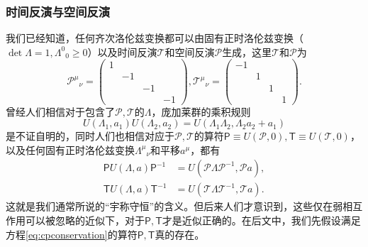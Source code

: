 \subsubsection{时间反演与空间反演}
我们已经知道，任何齐次洛伦兹变换都可以由固有正时洛伦兹变换（$ \det \Lambda =1,\Lambda ^{0}{}_{0} \geq 0$）以及时间反演$ \mathscr{T}$和空间反演$ \mathscr{P}$生成，这里$ \mathscr{T}$和$ \mathscr{P}$为
\begin{equation*}
	\mathscr{P}^{\mu }{}_{\nu } =\begin{pmatrix}
		1 &  &  & \\
		& -1 &  & \\
		&  & -1 & \\
		&  &  & -1
	\end{pmatrix} ,\mathscr{T}^{\mu }{}_{\nu } =\begin{pmatrix}
		-1 &  &  & \\
		& 1 &  & \\
		&  & 1 & \\
		&  &  & 1
	\end{pmatrix} .
\end{equation*}
曾经人们相信对于包含了$ \mathscr{P} ,\mathscr{T}$的$ \Lambda $，庞加莱群的乘积规则
\begin{equation*}
	U( \Lambda _{1} ,a_{1}) U( \Lambda _{2} ,a_{2}) =U( \Lambda _{1} \Lambda _{2} ,\Lambda _{2} a_{2} +a_{1})
\end{equation*}
是不证自明的，同时人们也相信对应于$ \mathscr{P} ,\mathscr{T}$的算符$ \mathsf{P} \equiv U(\mathscr{P} ,0) ,\mathsf{T} \equiv U(\mathscr{T} ,0)$，以及任何固有正时洛伦兹变换$ \Lambda ^{\mu }{}_{\nu }$和平移$ a^{\mu }$，都有
\begin{equation}
	\begin{aligned}
		\mathsf{P} U( \Lambda ,a)\mathsf{P}^{-1} & =U(\mathscr{P} \Lambda \mathscr{P}^{-1} ,\mathscr{P} a),\\
		\mathsf{T} U( \Lambda ,a)\mathsf{T}^{-1} & =U(\mathscr{T} \Lambda \mathscr{T}^{-1} ,\mathscr{T} a).
		\label{eq:cpconservation}
	\end{aligned}
\end{equation}
这就是我们通常所说的“宇称守恒”的含义。但后来人们才意识到，这些仅在弱相互作用可以被忽略的近似下，对于$ \mathsf{P} ,\mathsf{T}$才是近似正确的。在后文中，我们先假设满足方程\ref{eq:cpconservation}的算符$ \mathsf{P} ,\mathsf{T}$真的存在。

